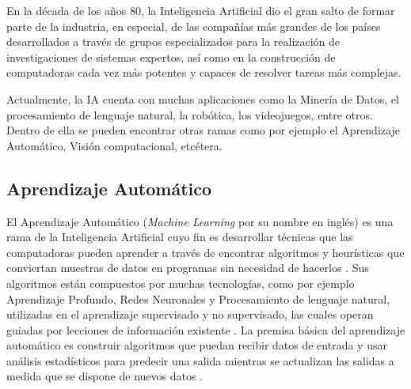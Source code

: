 En la década de los años 80, la Inteligencia Artificial dio el gran salto de formar parte de la industria, en especial, de las compañías más grandes de los países desarrollados a través de grupos especializados para la realización de investigaciones de sistemas expertos, así como en la construcción de computadoras cada vez más potentes y capaces de resolver tareas más complejas.

Actualmente, la IA cuenta con muchas aplicaciones como la Minería de Datos, el procesamiento de lenguaje natural, la robótica, los videojuegos, entre otros. Dentro de ella se pueden encontrar otras ramas como por ejemplo el Aprendizaje Automático, Visión computacional, etcétera.

\subsection{Aprendizaje Automático}
El Aprendizaje Automático (\textit{Machine Learning} por su nombre en inglés) es una rama de la Inteligencia Artificial cuyo fin es desarrollar técnicas que las computadoras pueden aprender a través de encontrar algoritmos y heurísticas que conviertan muestras de datos en programas sin necesidad de hacerlos \parencite{bk_russell2009intart}. Sus algoritmos están compuestos por muchas tecnologías, como por ejemplo Aprendizaje Profundo, Redes Neuronales y Procesamiento de lenguaje natural, utilizadas en el aprendizaje supervisado y no supervisado, las cuales operan guiadas por lecciones de información existente \parencite{gl_gartner2019ml}. La premisa básica del aprendizaje automático es construir algoritmos que puedan recibir datos de entrada y usar análisis estadísticos para predecir una salida mientras se actualizan las salidas a medida que se dispone de nuevos datos \parencite{bk_alpaydin2014ml}.

